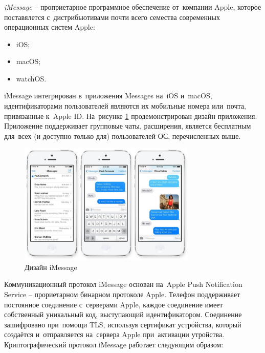 \subsubsection{}
\label{sec:analysis:research:analogs:imessage}

\textit{iMessage} -- проприетарное программное обеспечение от~компании Apple, которое поставялется с~дистрибьютивами почти всего семества современных операционных систем Apple:
\begin{itemize}
	\item iOS;
	\item macOS;
	\item watchOS.
\end{itemize}

iMessage интегрирован в~приложения Messages на~iOS и~macOS, идентификаторами пользователей являются их мобильные номера или~почта, привязанные к~Apple ID. На~рисунке \ref{sec:analysis:research:analogs:imessage:design} продемонстрирован дизайн приложения. Приложение поддерживает групповые чаты, расширения, является бесплатным для~всех (и доступно только для) пользователей ОС, перечисленных выше.

\begin{figure}[h]
  \centering
    \includegraphics[width=0.75\textwidth]{inc/img/imdesign.jpeg}
  \caption{Дизайн iMessage}
  \label{sec:analysis:research:analogs:imessage:design}
\end{figure}

Коммуникационный протокол iMessage основан на~Apple Push Notification Service -- прориетарном бинарном протоколе Apple. Телефон поддерживает постоянное соединение с~серверами Apple, каждое соединение имеет собственный уникальный код, выступающий идентификатором. Соединение зашифровано при~помощи TLS, используя сертификат устройства, который создаётся и~отправляется на~сервера Apple при~активации утройства.
Криптографический протокол iMessage работает следующим образом:


